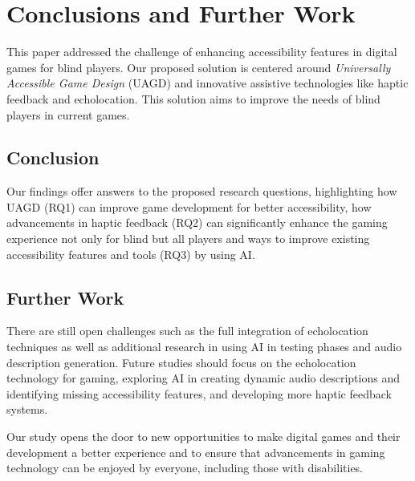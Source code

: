 \documentclass[sigconf,natbib=false,10pt]{acmart}
\begin{document}
	\section{Conclusions and Further Work}
	This paper addressed the challenge of enhancing accessibility features in digital games for blind players.
	Our proposed solution is centered around \emph{Universally Accessible Game Design} (UAGD) and innovative assistive technologies like haptic feedback and echolocation.
	This solution aims to improve the needs of blind players in current games.
	
	\subsection{Conclusion}
	Our findings offer answers to the proposed research questions, highlighting how UAGD (RQ1) can improve game development for better accessibility, how advancements in haptic feedback (RQ2) can significantly enhance the gaming experience not only for blind but all players and ways to improve existing accessibility features and tools (RQ3) by using AI.
	
	\subsection{Further Work}
	There are still open challenges such as the full integration of echolocation techniques as well as additional research in using AI in testing phases and audio description generation.
	Future studies should focus on the echolocation technology for gaming, exploring AI in creating dynamic audio descriptions and identifying missing accessibility features, and developing more haptic feedback systems.
	
	Our study opens the door to new opportunities to make digital games and their development a better experience and to ensure that advancements in gaming technology can be enjoyed by everyone, including those with disabilities.
	
	\printbibliography
	
\end{document}
